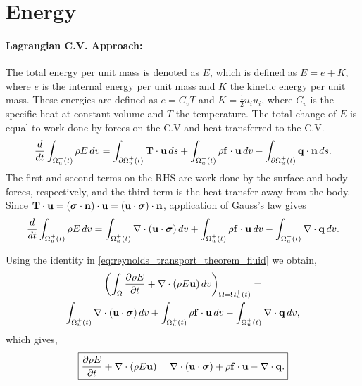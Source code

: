 \documentclass[oneside,a4paper,11pt]{report}
\begin{document}
\section{Energy}

\paragraph{Lagrangian C.V. Approach:}
The total energy per unit mass is denoted as $E$, which is defined as $E = e + K$, where $e$ is the internal energy per unit mass and $K$ the kinetic energy per unit mass. These energies are defined as $e = C_vT$ and $K = \frac{1}{2} u_i u_i$, where $C_v$ is the specific heat at constant volume and $T$ the temperature. The total change of $E$ is equal to work done by forces on the C.V and heat transferred to the C.V.
\begin{equation}
\frac{d}{dt}\int_{\Omega^+_u(t)} \rho E\,dv = \int_{\partial \Omega^+_u(t)} \mathbf{T} \cdot \mathbf{u} \,ds + \int_{\Omega^+_u(t)} \rho \mathbf{f} \cdot \mathbf{u} \,dv - \int_{\partial \Omega^+_u(t)} \mathbf{q} \cdot \mathbf{n} \, ds.
\end{equation}
The first and second terms on the RHS are work done by the surface and body forces, respectively, and the third term is the heat transfer away from the body. Since $\mathbf{T} \cdot \mathbf{u} = (\boldsymbol{\sigma} \cdot \mathbf{n}) \cdot \mathbf{u} = (\mathbf{u} \cdot \boldsymbol{\sigma}) \cdot \mathbf{n}$, application of Gauss's law gives
\begin{equation}
\frac{d}{dt}\int_{\Omega^+_u(t)} \rho E\,dv = \int_{\Omega^+_u(t)} \nabla \cdot (\mathbf{u} \cdot \boldsymbol{\sigma}) \,dv + \int_{\Omega^+_u(t)} \rho \mathbf{f} \cdot \mathbf{u} \,dv - \int_{\Omega^+_u(t)} \nabla \cdot \mathbf{q} \, dv.
\end{equation}

Using the identity in \cref{eq:reynolds_transport_theorem_fluid} we obtain,
\begin{multline}
\left(\int_{\Omega} \frac{\partial \rho E}{\partial t} +\nabla \cdot (\rho E \mathbf{u}) \,dv \right)_{\Omega = \Omega^+_u(t)} =\\ 
\int_{\Omega^+_u(t)}\nabla\cdot(\mathbf{u} \cdot \boldsymbol{\sigma} )\,dv
+ \int_{\Omega^+_u(t)} \rho \mathbf{f} \cdot \mathbf{u} \,dv
- \int_{\Omega^+_u(t)} \nabla\cdot\mathbf{q}\,dv,
\end{multline}
which gives,
\begin{equation}
    \boxed{\frac{\partial \rho E}{\partial t} +\nabla \cdot ( \rho E \mathbf{u} ) = \nabla\cdot(\mathbf{u} \cdot \boldsymbol{\sigma} ) + \rho \mathbf{f} \cdot \mathbf{u} - \nabla \cdot \mathbf{q}.}
\end{equation}
\end{document}
